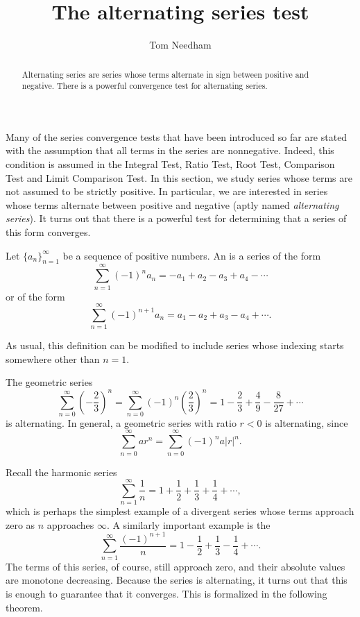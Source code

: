 \documentclass{ximera}
\title[Dig-In:]{The alternating series test}
\author{Tom Needham}
\begin{document}
\begin{abstract}
Alternating series are series whose terms alternate in sign between positive and negative. There is a powerful convergence test for alternating series. 
\end{abstract}
\maketitle

Many of the series convergence tests that have been introduced so far are stated with the assumption that all terms in the series are nonnegative. Indeed, this condition is assumed in the Integral Test, Ratio Test, Root Test, Comparison Test and Limit Comparison Test. In this section, we study series whose terms are not assumed to be strictly positive. In particular, we are interested in series whose terms alternate between positive and negative (aptly named \emph{alternating series}). It turns out that there is a powerful test for determining that a series of this form converges. 

\begin{definition}
Let $\{a_n\}_{n=1}^\infty$ be a sequence of positive numbers. An  is
a series of the form 
\[
\sum_{n=1}^\infty (-1)^n a_n = -a_1 + a_2 - a_3 + a_4 - \cdots
\]
or of the form
$$
\sum_{n=1}^\infty (-1)^{n+1}a_n = a_1 - a_2 + a_3 - a_4 + \cdots.
$$

As usual, this definition can be modified to include series whose indexing starts somewhere other than $n=1$. 
\end{definition}

\begin{example}
The geometric series
$$
\sum_{n=0}^\infty \left(-\frac{2}{3}\right)^n = \sum_{n=0}^\infty \left(-1\right)^n \left(\frac{2}{3}\right)^n = 1 - \frac{2}{3} + \frac{4}{9} - \frac{8}{27} + \cdots
$$
is alternating. In general, a geometric series with ratio $r < 0$ is alternating, since
$$
\sum_{n=0}^\infty a r^n = \sum_{n=0}^\infty (-1)^n a  |r|^n.
$$
\end{example}

\begin{example}
Recall the harmonic series
$$
\sum_{n=1}^\infty \frac{1}{n} = 1 + \frac{1}{2} + \frac{1}{3} + \frac{1}{4} + \cdots,
$$
which is perhaps the simplest example of a divergent series whose terms approach zero as $n$ approaches $\infty$. 
A similarly important example is the 
$$
\sum_{n=1}^\infty \frac{(-1)^{n+1}}{n} = 1 - \frac{1}{2} + \frac{1}{3} - \frac{1}{4} + \cdots.
$$
The terms of this series, of course, still approach zero, and their absolute values are monotone decreasing. Because the series is alternating, it turns out that this is enough to guarantee that it converges. This is formalized in the following theorem.
\end{example}
\end{document}
